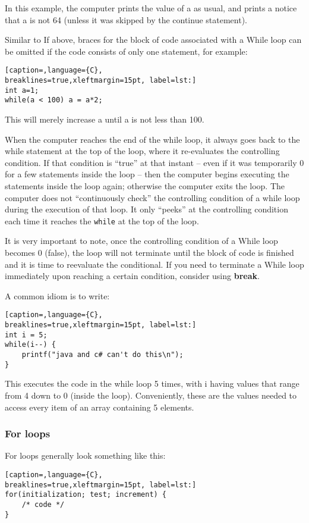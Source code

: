 In this example, the computer prints the value of a as usual, and prints a
notice that a is not 64 (unless it was skipped by the continue statement).

Similar to If above, braces for the block of code associated with a While loop
can be omitted if the code consists of only one statement, for example:
\lstset{basicstyle=\scriptsize, numbers=left, captionpos=b, tabsize=4}
\begin{lstlisting}[caption=,language={C},
breaklines=true,xleftmargin=15pt, label=lst:]
int a=1;
while(a < 100) a = a*2;
\end{lstlisting}

This will merely increase a until a is not less than 100.

When the computer reaches the end of the while loop, it always goes back to the
while statement at the top of the loop, where it re-evaluates the controlling
condition.  If that condition is ``true'' at that instant -- even if it was
temporarily 0 for a few statements inside the loop -- then the computer begins
executing the statements inside the loop again; otherwise the computer exits
the loop.  The computer does not ``continuously check'' the controlling
condition of a while loop during the execution of that loop.  It only ``peeks''
at the controlling condition each time it reaches the \texttt{while} at the top
of the loop.

It is very important to note, once the controlling condition of a While loop
becomes 0 (false), the loop will not terminate until the block of code is
finished and it is time to reevaluate the conditional. If you need to terminate
a While loop immediately upon reaching a certain condition, consider using
\textbf{break}.

A common idiom is to write:
\lstset{basicstyle=\scriptsize, numbers=left, captionpos=b, tabsize=4}
\begin{lstlisting}[caption=,language={C},
breaklines=true,xleftmargin=15pt, label=lst:]
int i = 5;
while(i--) {
	printf("java and c# can't do this\n");
}
\end{lstlisting}

This executes the code in the while loop 5 times, with i having values that
range from 4 down to 0 (inside the loop). Conveniently, these are the values
needed to access every item of an array containing 5 elements.

\subsubsection{For loops}
For loops generally look something like this:
\lstset{basicstyle=\scriptsize, numbers=left, captionpos=b, tabsize=4}
\begin{lstlisting}[caption=,language={C},
breaklines=true,xleftmargin=15pt, label=lst:]
for(initialization; test; increment) {
	/* code */
}
\end{lstlisting}

